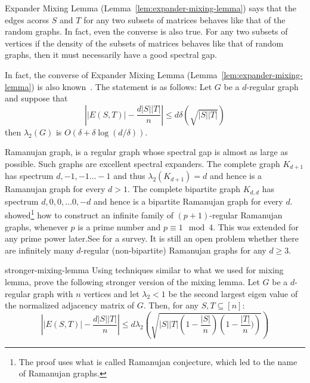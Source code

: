 \begin{curiousity}
Expander Mixing Lemma (Lemma~\ref{lem:expander-mixing-lemma}) says that the edges acorss $S$ and $T$ for any two subsets of matrices behaves like that of the random graphs. In fact, even the converse is also true. For any two subsets of vertices if the density of the subsets of matrices behaves like that of random graphs, then it must necessarily have a good spectral gap.

In fact, the converse of Expander Mixing Lemma (Lemma~\ref{lem:expander-mixing-lemma}) is also known~\cite{BL06}. The statement is as follows:
Let $G$ be a $d$-regular graph and suppose that
$$\left||E(S,T)|-\frac{d|S||T|}{n}\right| \le d\delta \left(\sqrt{|S||T|}\right)$$
then $\lambda_2(G)$ is $O\left(\delta+\delta\log\left(d/\delta\right)\right)$.
\end{curiousity}

%
\begin{curiousity}
Ramanujan graph, is a regular graph whose spectral gap is almost as large as possible. Such graphs are excellent spectral expanders. The complete graph $K_{d+1}$  has spectrum $d,-1, -1 \ldots -1$ and thus $\lambda_2(K_{d+1}) = d$ and hence is a Ramanujan graph for every $d > 1$. The complete bipartite graph $K_{d,d}$ has spectrum $d,0,0, \ldots 0, -d$ and hence is a bipartite Ramanujan graph for every $d$. \cite{LRS88} showed\footnote{The proof uses what is called Ramanujan conjecture, which led to the name of Ramanujan graphs.} how to construct an infinite family of $(p+1)$-regular Ramanujan graphs, whenever $p$ is a prime number and $p \equiv 1 \mod 4$. This was extended for any prime power later.See \cite{Mur03} for a survey. 
It is still an open problem whether there are infinitely many $d$-regular (non-bipartite) Ramanujan graphs for any $d \geq 3$.
\end{curiousity}

\begin{exercise-prob}
\begin{show-ps3}{stronger-mixing-lemma}
Using techniques similar to what we used for mixing lemma, prove the following stronger version of the mixing lemma. Let $G$ be a $d$-regular graph with $n$ vertices and let $\lambda_2<1$ be the second largest eigen value of the normalized adjacency matrix of $G$. Then, for any $S, T \subseteq [n]$:
$$\left||E(S,T)|-\frac{d|S||T|}{n}\right| \le d\lambda_2 \left(\sqrt{|S||T|\left(1-\frac{|S|}{n}\right)\left(1-\frac{|T|}{n})\right)}\right)$$
\end{show-ps3}
\end{exercise-prob}

